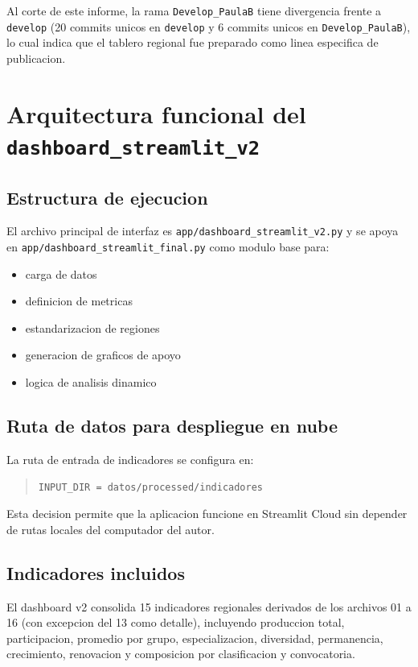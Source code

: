 \documentclass[12pt,letterpaper]{article}
\begin{document}
Al corte de este informe, la rama \texttt{Develop\_PaulaB} tiene divergencia frente a \texttt{develop} (20 commits unicos en \texttt{develop} y 6 commits unicos en \texttt{Develop\_PaulaB}), lo cual indica que el tablero regional fue preparado como linea especifica de publicacion.

\section{Arquitectura funcional del \texttt{dashboard\_streamlit\_v2}}

\subsection{Estructura de ejecucion}

El archivo principal de interfaz es \texttt{app/dashboard\_streamlit\_v2.py} y se apoya en \texttt{app/dashboard\_streamlit\_final.py} como modulo base para:

\begin{itemize}
    \item carga de datos
    \item definicion de metricas
    \item estandarizacion de regiones
    \item generacion de graficos de apoyo
    \item logica de analisis dinamico
\end{itemize}

\subsection{Ruta de datos para despliegue en nube}

La ruta de entrada de indicadores se configura en:

\begin{quote}
\texttt{INPUT\_DIR = datos/processed/indicadores}
\end{quote}

Esta decision permite que la aplicacion funcione en Streamlit Cloud sin depender de rutas locales del computador del autor.

\subsection{Indicadores incluidos}

El dashboard v2 consolida 15 indicadores regionales derivados de los archivos 01 a 16 (con excepcion del 13 como detalle), incluyendo produccion total, participacion, promedio por grupo, especializacion, diversidad, permanencia, crecimiento, renovacion y composicion por clasificacion y convocatoria.
\end{document}
